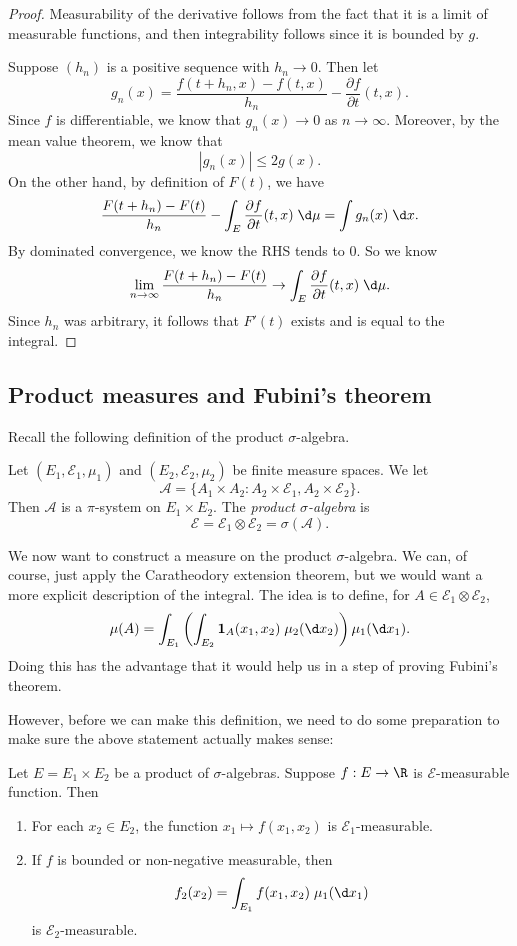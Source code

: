 \documentclass[a4paper]{article}
\begin{document}
\begin{proof}
  Measurability of the derivative follows from the fact that it is a limit of measurable functions, and then integrability follows since it is bounded by $g$.

  Suppose $(h_n)$ is a positive sequence with $h_n \to 0$. Then let
  \[
    g_n(x) = \frac{f(t + h_n, x) - f(t, x)}{h_n} - \frac{\partial f}{\partial t}(t, x).
  \]
  Since $f$ is differentiable, we know that $g_n(x) \to 0$ as $n \to \infty$. Moreover, by the mean value theorem, we know that
  \[
    |g_n(x)| \leq 2g(x).
  \]
  On the other hand, by definition of $F(t)$, we have
  \[
    \frac{F(t + h_n) - F(t)}{h_n} - \int_E \frac{\partial f}{\partial t}(t, x) \;\d \mu = \int g_n(x)\;\d x.
  \]
  By dominated convergence, we know the RHS tends to $0$. So we know
  \[
    \lim_{n \to \infty} \frac{F(t + h_n) - F(t)}{h_n} \to \int_E \frac{\partial f}{\partial t}(t, x)\;\d \mu.
  \]
  Since $h_n$ was arbitrary, it follows that $F'(t)$ exists and is equal to the integral.
\end{proof}

\subsection{Product measures and Fubini's theorem}
Recall the following definition of the product $\sigma$-algebra.
\begin{defi}
  Let $(E_1, \mathcal{E}_1, \mu_1)$ and $(E_2, \mathcal{E}_2, \mu_2)$ be finite measure spaces. We let
  \[
    \mathcal{A} = \{A_1 \times A_2: A_2 \times \mathcal{E}_1, A_2 \times \mathcal{E}_2\}.
  \]
  Then $\mathcal{A}$ is a $\pi$-system on $E_1 \times E_2$. The \emph{product $\sigma$-algebra} is
  \[
    \mathcal{E} = \mathcal{E}_1 \otimes \mathcal{E}_2 = \sigma(\mathcal{A}).
  \]
\end{defi}
We now want to construct a measure on the product $\sigma$-algebra. We can, of course, just apply the Caratheodory extension theorem, but we would want a more explicit description of the integral. The idea is to define, for $A \in \mathcal{E}_1 \otimes \mathcal{E}_2$,
\[
  \mu(A) = \int_{E_1} \left(\int_{E_2} \mathbf{1}_A(x_1, x_2)\;\mu_2(\d x_2)\right)\mu_1(\d x_1).
\]
Doing this has the advantage that it would help us in a step of proving Fubini's theorem.

However, before we can make this definition, we need to do some preparation to make sure the above statement actually makes sense:
\begin{lemma}
  Let $E = E_1 \times E_2$ be a product of $\sigma$-algebras. Suppose $f: E \to \R$ is $\mathcal{E}$-measurable function. Then
  \begin{enumerate}
    \item For each $x_2 \in E_2$, the function $x_1 \mapsto f(x_1, x_2)$ is $\mathcal{E}_1$-measurable.
    \item If $f$ is bounded or non-negative measurable, then
      \[
        f_2(x_2) = \int_{E_1} f(x_1, x_2)\; \mu_1(\d x_1)
      \]
      is $\mathcal{E}_2$-measurable.
  \end{enumerate}
\end{lemma}
\end{document}
